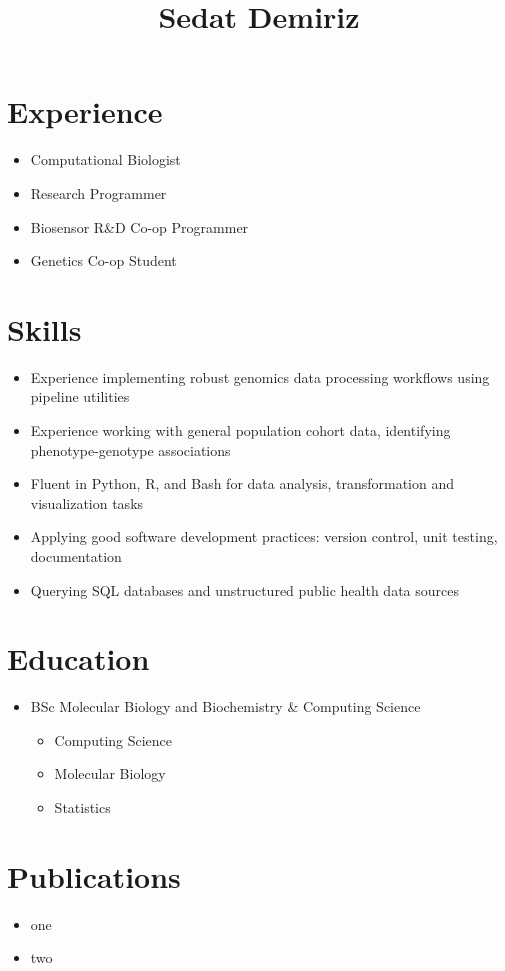\documentclass{article}
\title{Sedat Demiriz}
\begin{document}
  \maketitle

\section{Experience}
\begin{itemize}
  \item Computational Biologist
  \item Research Programmer
  \item Biosensor R\&D Co-op Programmer
  \item Genetics Co-op Student
\end{itemize}

\section{Skills}
\begin{itemize}
  \item Experience implementing robust genomics data processing workflows using pipeline utilities
  \item Experience working with general population cohort data, identifying phenotype-genotype associations
  \item Fluent in Python, R, and Bash for data analysis, transformation and visualization tasks
  \item Applying good software development practices: version control, unit testing, documentation
  \item Querying SQL databases and unstructured public health data sources
\end{itemize}

\section{Education}
\begin{itemize}
  \item BSc Molecular Biology and Biochemistry \& Computing Science
    \begin{itemize}
      \item Computing Science
      \item Molecular Biology
      \item Statistics
    \end{itemize}
\end{itemize}

\section{Publications}
\begin{itemize}
  \item one
  \item two
\end{itemize}
\end{document}
